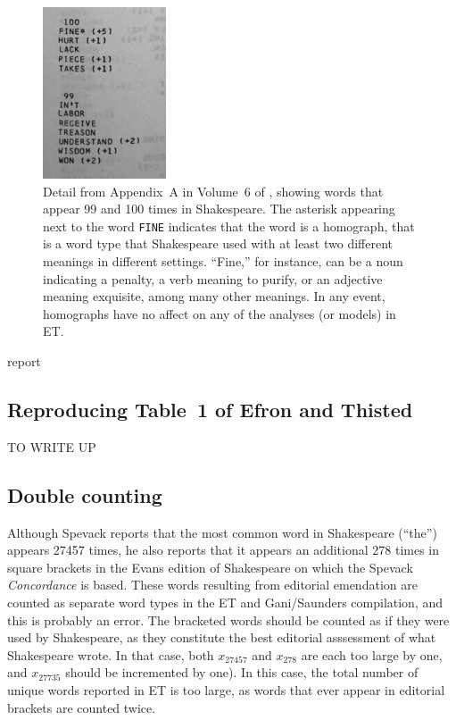 \begin{figure}
	\centering
	\includegraphics[height=2in]{../compendium/Figures/IMG_4950_detail.pdf}
	\caption[]{Detail from Appendix~A in Volume~6 of \citet[p.~4181]{Spevack:1968qd}, showing words that appear 99 and 100 times in Shakespeare. The asterisk appearing next to the word \texttt{FINE} indicates that the word is a homograph, that is a word type that Shakespeare used with at least two different meanings in different settings.  ``Fine,'' for instance, can be a noun indicating a penalty, a verb meaning to purify, or an adjective meaning exquisite, among many other meanings.  In any event, homographs have no affect on any of the analyses (or models) in ET.}
	\label{fig:appendixadetail}
\end{figure}

{\LARGE \color{red}\citeauthor{Efron:1976zs} report}

\subsection{Reproducing Table~1 of Efron and Thisted} %
\label{sub:et_table_1}
{\LARGE \color{red} TO WRITE UP}


\subsection{Double counting} %
\label{sub:double_counting}

Although Spevack reports that the most common word in Shakespeare (``the'') appears 27457 times, he also reports that it appears an additional 278 times in square brackets in the Evans edition of Shakespeare on which the Spevack \textit{Concordance} is based.  These words resulting from editorial emendation are counted as separate word types in the ET and Gani/Saunders compilation, and this is probably an error.  The bracketed words should be counted as if they were used by Shakespeare, as they constitute the best editorial asssessment of what Shakespeare wrote.  In that case, both $x_{27457}$ and $x_{278}$ are each too large by one, and $x_{27735}$ should be incremented by one).  In this case, the total number of unique words reported in ET is too large, as words that ever appear in editorial brackets are counted twice.

